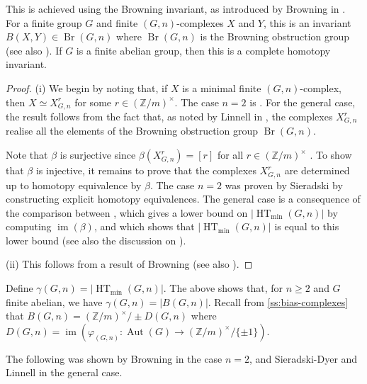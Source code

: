 \documentclass[11pt,a4paper,leqno]{amsart}
\theoremstyle{definition}
\theoremstyle{remark}
\newcommand{\Z}{\mathbb{Z}}
\DeclareMathOperator{\Aut}{Aut}
\DeclareMathOperator{\IM}{im}
\DeclareMathOperator{\Br}{Br}
\DeclareMathOperator{\HT}{HT}
\begin{document}
This is achieved using the Browning invariant, as introduced by Browning in \cite{Browning:1979c}. For a finite group $G$ and finite $(G,n)$-complexes $X$ and $Y$, this is an invariant $B(X,Y) \in \Br(G,n)$ where $\Br(G,n)$ is the Browning obstruction group (see also \cite[Section 2]{Latiolais:1993}). If $G$ is a finite abelian group, then this is a complete homotopy invariant.

\begin{proof}
(i) We begin by noting that, if $X$ is a minimal finite $(G,n)$-complex, then $X \simeq X^r_{G,n}$ for some $r \in (\Z/m)^\times$. The case $n=2$ is \cite[Theorem 1.7]{Browning:1979c}. For the general case, the result follows from the fact that, as noted by Linnell in \cite[p318]{Linnell:1993}, the complexes $X^r_{G,n}$ realise all the elements of the Browning obstruction group $\Br(G,n)$.

Note that $\beta$ is surjective since $\beta(X^r_{G,n}) = [r]$ for all $r \in (\Z/m)^\times$ \cite[Proposition 6]{Sieradski:1979}. To show that $\beta$ is injective, it remains to prove that the complexes $X^r_{G,n}$ are determined up to homotopy equivalence by $\beta$. The case $n=2$ was proven by Sieradski \cite{Sieradski:1977} by constructing explicit homotopy equivalences.
The general case is a consequence of the comparison between \cite[Proposition 8]{Sieradski:1979}, which gives a lower bound on $|\HT_{\min}(G,n)|$ by computing $\IM(\beta)$, and \cite[Theorem 1.3]{Linnell:1993} which shows that $|\HT_{\min}(G,n)|$ is equal to this lower bound (see also the discussion on \cite[p307]{Linnell:1993}).

(ii) This follows from a result of Browning \cite[Theorem 5.4]{Browning:1979} (see also \cite[Theorem 1.1]{Linnell:1993}).
\end{proof}

Define $\gamma(G,n) = |\HT_{\min}(G,n)|$. The above shows that, for $n \ge 2$ and $G$ finite abelian, we have $\gamma(G,n) = |B(G,n)|$. Recall from \cref{ss:bias-complexes} that $B(G,n) = (\Z/m)^\times/\pm D(G,n)$ where $D(G,n) = \IM(\varphi_{(G,n)} \colon \Aut(G) \to (\Z/m)^\times/\{\pm 1\})$.

The following was shown by Browning \cite{Browning:1979} in the case $n=2$, and Sieradski-Dyer \cite[Proposition 8]{Sieradski:1979} and Linnell \cite[Theorem 1.3 \& Corollary 1.5]{Linnell:1993} in the general case.
\end{document}
